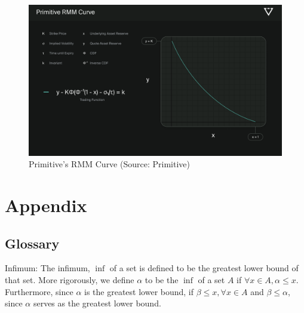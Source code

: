 \documentclass[12pt]{article}
\begin{document}
\begin{figure}[H]
    \centering
    \includegraphics[width=0.8\linewidth]{Primitive.png}
    \caption{Primitive's RMM Curve (Source: Primitive)}
    \label{fig:primitive}
\end{figure}


\section*{Appendix}

\subsection{Glossary}\label{subsec:glossary}
Infimum: The infimum, \(\inf\) of a set is defined to be the greatest lower bound of that set. More rigorously, we define \(\alpha\) to be the \(\inf\) of a set \(A\) if \(\forall x \in A, \alpha \leq x.\)
Furthermore, since \(\alpha\) is the greatest lower bound, if \(\beta \leq x, \forall x \in A\) and \(\beta \leq \alpha\), since \(\alpha\) serves as the greatest lower bound.
\end{document}
